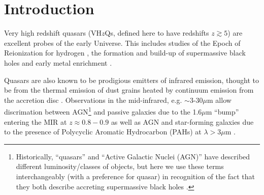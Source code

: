 \documentclass[usenatbib]{mnras}
\begin{document}
\section{Introduction}
Very high redshift quasars (VH$z$Qs, defined here to have redshifts
$z\gtrsim5$) are excellent probes of the early Universe. This includes
studies of the Epoch of Reionization for hydrogen \citep[see e.g.][for
reviews]{Fan2006review, Mortlock2016}, the formation and build-up of
supermassive black holes \citep[e.g., ][]{Rees1984, WyitheLoeb2003,
Volonteri2010, Agarwal2016, Valiante2018, Latif2018} and early metal
enrichment \citep[see e.g., ][]{Simcoe2012, Chen2017, Bosman2017}.


Quasars are also known to be prodigious emitters of infrared emission,
thought to be from the thermal emission of dust grains heated by
continuum emission from the accretion disc \citep[][]{Hill2014,
Hickox2017}.  Observations in the mid-infrared, e.g. $\sim$3-30$\mu$m
allow discrimation between AGN\footnote{Historically, ``quasars'' and
``Active Galactic Nuclei (AGN)'' have described different
luminosity/classes of objects, but here we use these terms
interchangeably (with a preference for quasar) in recognition of the
fact that they both describe accreting supermassive black holes
\citep[e.g.][]{Haardt2016book}.}  and passive galaxies due to the
1.6$\mu$m ``bump'' entering the MIR at $z\approx0.8-0.9$ \citep[e.g.,
][]{Wright1994, Sawicki2002, Lacy2004, Stern2005, Richards2006b,
Timlin2016} as well as AGN and star-forming galaxies due to the
presence of Polycyclic Aromatic Hydrocarbon (PAHs) at $\lambda >3\mu$m
\citep[e.g., ][]{Yan2007, Tielens2008}.
\end{document}
